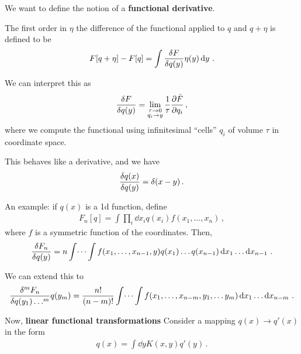 \documentclass[main.tex]{subfiles}
\begin{document}

We want to define the notion of a \textbf{functional derivative}. 

The first order in \(\eta \) the difference of the functional applied to \(q\) and \(q + \eta \) is defined to be 
%
\begin{align}
F[q + \eta ] - F[q ] = \int  \fdv{F}{q(y)} \eta (y) \dd{y}
\,.
\end{align}

We can interpret this as 
%
\begin{subequations}
\begin{align}
\fdv{F}{q (y)} = \lim_{\substack{\tau \to 0 \\ q_{i} \to y} } \frac{1}{\tau } \pdv{\hat{F}}{q_{i}}
\,,
\end{align}
\end{subequations}
%
where we compute the functional using infinitesimal ``cells'' \(q_i\)  of volume \(\tau \) in coordinate space.

This behaves like a derivative, and we have 
%
\begin{align}
\fdv{q(x)}{q(y)} = \delta (x- y)
\,.
\end{align}

An example: if \(q(x)\) is a 1d function, define 
%
\begin{align}
F_{n}[q] = \int \prod_i \dd{x_{i}} q(x_{i}) f(x_1, \dots, x_{n})  
\,,
\end{align}
%
where \(f\) is a symmetric function of the coordinates. Then, 
%
\begin{align}
\fdv{F_{n}}{q(y)} = n \int \dots \int f(x_1 , \dots, x_{n-1}, y) q(x_1 ) \dots q(x_{n-1}) \dd{x_{1}} \dots \dd{x_{n-1}}
\,.
\end{align}

We can extend this to 
%
\begin{align}
\fdv[m]{F_{n}}{q(y_1 )\dots}{ q(y_m)}
= \frac{n!}{(n-m)!} \int  \dots \int f(x_1, \dots, x_{n-m}, y_1, \dots y_{m}) \dd{x_1 } \dots \dd{x_{n-m}}
\,.
\end{align}

Now, \textbf{linear functional transformations}
Consider a mapping \(q (x) \to q' (x)\) in the form 
%
\begin{align}
q(x) = \int \dd{y} K(x, y) q' (y)
\,.
\end{align}
\end{document}

